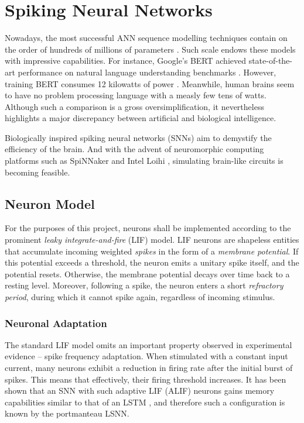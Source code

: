 \documentclass[../../report.tex]{subfiles}
\begin{document}
\section{Spiking Neural Networks}

Nowadays, the most successful ANN sequence modelling techniques contain on the
order of hundreds of millions of parameters \cite{Bender2021}. Such scale endows
these models with impressive capabilities. For instance, Google's BERT achieved
state-of-the-art performance on natural language understanding benchmarks
\cite{Devlin2019}. However, training BERT consumes 12 kilowatts of power
\cite{Strubell2019}. Meanwhile, human brains seem to have no problem processing
language with a measly few tens of watts. Although such a comparison is a gross
oversimplification, it nevertheless highlights a major discrepancy between
artificial and biological intelligence.

Biologically inspired spiking neural networks (SNNs) aim to demystify the
efficiency of the brain. And with the advent of neuromorphic computing platforms
such as SpiNNaker \cite{Furber2014} and Intel Loihi \cite{Davies2018},
simulating brain-like circuits is becoming feasible.

\subsection{Neuron Model}

For the purposes of this project, neurons shall be implemented according to the
prominent \emph{leaky integrate-and-fire} (LIF) model. LIF neurons are shapeless
entities that accumulate incoming weighted \emph{spikes} in the form of a
\emph{membrane potential}. If this potential exceeds a threshold, the neuron
emits a unitary spike itself, and the potential resets. Otherwise, the membrane
potential decays over time back to a resting level. Moreover, following a spike,
the neuron enters a short \emph{refractory period}, during which it cannot spike
again, regardless of incoming stimulus.


\subsubsection{Neuronal Adaptation}
The standard LIF model omits an important property observed in experimental
evidence -- spike frequency adaptation. When stimulated with a constant input
current, many neurons exhibit a reduction in firing rate after the initial burst
of spikes. This means that effectively, their firing threshold increases. It has
been shown that an SNN with such adaptive LIF (ALIF) neurons gains memory
capabilities similar to that of an LSTM \cite{Bellec2018LSNN}, and therefore
such a configuration is known by the portmanteau LSNN.
\end{document}
